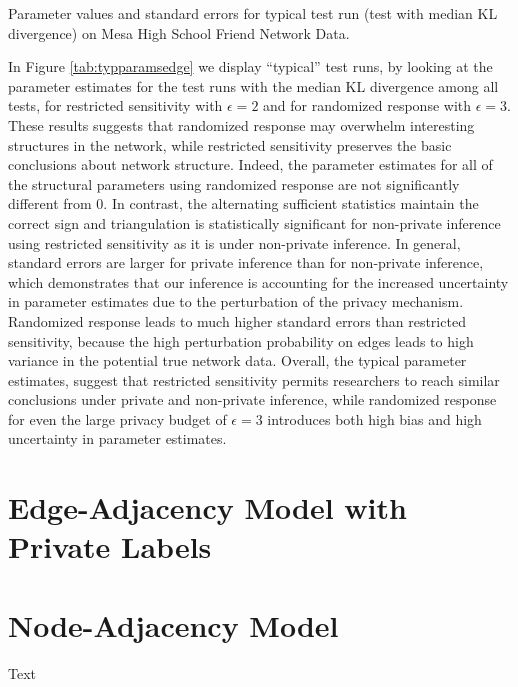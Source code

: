     \begin{table}[h]
  	\caption{Parameter values and standard errors for typical test run (test with median KL divergence) on Mesa High School Friend Network Data.} 
  	\label{tab:typparamsedge}
  	\centering
  	
  \end{table}
  
  In Figure \ref{tab:typparamsedge} we display ``typical'' test runs, by looking at the parameter estimates for the test runs with the median KL divergence among all tests, for  restricted sensitivity with $\epsilon=2$ and for randomized response with $\epsilon=3$. These results suggests that randomized response may overwhelm interesting structures in the network, while restricted sensitivity preserves the basic conclusions about network structure. Indeed, the parameter estimates for all of the structural parameters using randomized response are not significantly different from $0$. In contrast, the alternating sufficient statistics maintain the correct sign and triangulation is statistically significant for non-private inference using restricted sensitivity as it is under non-private inference. In general, standard errors are larger for private inference than for non-private inference, which demonstrates that our inference is accounting for the increased uncertainty in parameter estimates due to the perturbation of the privacy mechanism. Randomized response leads to much higher standard errors than restricted sensitivity, because the high perturbation probability on edges leads to high variance in the potential true network data. Overall, the typical parameter estimates, suggest that restricted sensitivity permits researchers to reach similar conclusions under private and non-private inference, while randomized response for even the large privacy budget of $\epsilon=3$ introduces both high bias and high uncertainty in parameter estimates.
 
 
 \section{Edge-Adjacency Model with Private Labels}

 
 \section{Node-Adjacency Model}
 
 Text
 